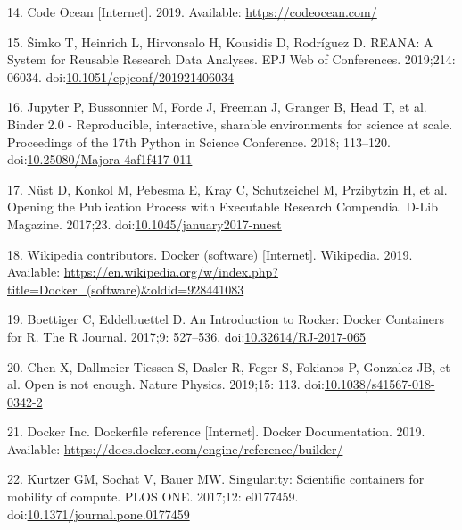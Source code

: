 \documentclass[10pt,letterpaper]{article}
\begin{document}
\leavevmode\hypertarget{ref-code_ocean_2019}{}%
14. Code Ocean {[}Internet{]}. 2019. Available:
\url{https://codeocean.com/}

\leavevmode\hypertarget{ref-simko_reana_2019}{}%
15. Šimko T, Heinrich L, Hirvonsalo H, Kousidis D, Rodríguez D. REANA: A
System for Reusable Research Data Analyses. EPJ Web of Conferences.
2019;214: 06034.
doi:\href{https://doi.org/10.1051/epjconf/201921406034}{10.1051/epjconf/201921406034}

\leavevmode\hypertarget{ref-jupyter_binder_2018}{}%
16. Jupyter P, Bussonnier M, Forde J, Freeman J, Granger B, Head T, et
al. Binder 2.0 - Reproducible, interactive, sharable environments for
science at scale. Proceedings of the 17th Python in Science Conference.
2018; 113--120.
doi:\href{https://doi.org/10.25080/Majora-4af1f417-011}{10.25080/Majora-4af1f417-011}

\leavevmode\hypertarget{ref-nust_opening_2017}{}%
17. Nüst D, Konkol M, Pebesma E, Kray C, Schutzeichel M, Przibytzin H,
et al. Opening the Publication Process with Executable Research
Compendia. D-Lib Magazine. 2017;23.
doi:\href{https://doi.org/10.1045/january2017-nuest}{10.1045/january2017-nuest}

\leavevmode\hypertarget{ref-wikipedia_contributors_docker_2019}{}%
18. Wikipedia contributors. Docker (software) {[}Internet{]}. Wikipedia.
2019. Available:
\url{https://en.wikipedia.org/w/index.php?title=Docker_(software)\&oldid=928441083}

\leavevmode\hypertarget{ref-boettiger_introduction_2017}{}%
19. Boettiger C, Eddelbuettel D. An Introduction to Rocker: Docker
Containers for R. The R Journal. 2017;9: 527--536.
doi:\href{https://doi.org/10.32614/RJ-2017-065}{10.32614/RJ-2017-065}

\leavevmode\hypertarget{ref-chen_open_2019}{}%
20. Chen X, Dallmeier-Tiessen S, Dasler R, Feger S, Fokianos P, Gonzalez
JB, et al. Open is not enough. Nature Physics. 2019;15: 113.
doi:\href{https://doi.org/10.1038/s41567-018-0342-2}{10.1038/s41567-018-0342-2}

\leavevmode\hypertarget{ref-docker_inc_dockerfile_2019}{}%
21. Docker Inc. Dockerfile reference {[}Internet{]}. Docker
Documentation. 2019. Available:
\url{https://docs.docker.com/engine/reference/builder/}

\leavevmode\hypertarget{ref-kurtzer_singularity_2017}{}%
22. Kurtzer GM, Sochat V, Bauer MW. Singularity: Scientific containers
for mobility of compute. PLOS ONE. 2017;12: e0177459.
doi:\href{https://doi.org/10.1371/journal.pone.0177459}{10.1371/journal.pone.0177459}
\end{document}

